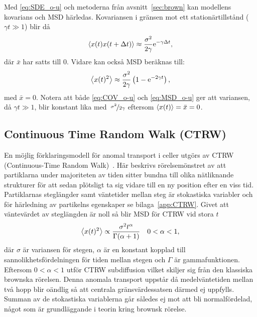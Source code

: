 Med \eqref{eq:SDE_o-u} och metoderna från avsnitt~\ref{sec:brown} kan modellens kovarians och MSD härledas. Kovariansen i gränsen mot ett stationärtillstånd ($\gamma t\gg 1$) blir då
\begin{equation}\label{eq:COV_o-u}
\ev{x(t)x(t+\Delta{t})} \approx \frac{\sigma^2}{2\gamma} \ee^{-\gamma\Delta{t}},
\end{equation}
där $\bar{x}$ har satts till 0. Vidare kan också MSD beräknas till:
\begin{equation}\label{eq:MSD_o-u}
\ev{x(t)^2} 
\approx \frac{\sigma^2}{2\gamma} \left( 1-\ee^{-2\gamma t} \right),
\end{equation}
med $\bar{x}=0$. Notera att både \eqref{eq:COV_o-u} och \eqref{eq:MSD_o-u} ger att variansen, då $\gamma t\gg 1$, blir konstant lika med~$\nicefrac{\sigma^2}{2\gamma}$ eftersom $\ev{x(t)}=\bar{x}=0$.


  
\subsection{Continuous Time Random Walk (CTRW)}
En möjlig förklaringsmodell för anomal transport i celler utgörs av CTRW (Continuous-Time Random Walk)~\cite{Hofling&Franosch2013}. Här beskrivs rörelsemönstret av att partiklarna under majoriteten av tiden sitter bundna till olika nätliknande strukturer för att sedan plötsligt ta sig vidare till en ny position efter en viss tid. Partiklarnas steglängder samt väntetider mellan steg är stokastiska variabler och för härledning av partikelns egenskaper se bilaga~\ref{app:CTRW}. Givet att väntevärdet av steglängden är noll så blir MSD för CTRW vid stora $t$
\begin{equation}\label{eq:CTRW_MSD}
    \ev{x(t)^2} \propto \frac{\sigma^2t^{\alpha}}{\Gamma (\alpha+1)}\quad 0<\alpha<1,
\end{equation}
där $\sigma$ är variansen för stegen, $\alpha$ är en konstant kopplad till sannolikhetsfördelningen för tiden mellan stegen och $\Gamma$ är gammafunktionen. Eftersom $0<\alpha<1$ utför CTRW subdiffusion vilket skiljer sig från den klassiska brownska rörelsen. Denna anomala transport uppstår då medelväntetiden mellan två hopp blir oändlig så att centrala gränsvärdessatsen därmed ej uppfylls. Summan av de stokastiska variablerna går således ej mot att bli normalfördelad, något som är grundläggande i teorin kring brownsk rörelse.


